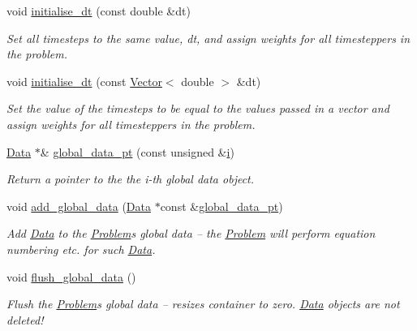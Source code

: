 \begin{DoxyCompactItemize}
void \hyperlink{classoomph_1_1Problem_a342b9bd9c4bc142f514907ee1d23d613}{initialise\+\_\+dt} (const double \&dt)
\begin{DoxyCompactList}\small\item\em Set all timesteps to the same value, dt, and assign weights for all timesteppers in the problem. \end{DoxyCompactList}\item 
void \hyperlink{classoomph_1_1Problem_a48137f1c7b297de56078f6bc0c83b675}{initialise\+\_\+dt} (const \hyperlink{classoomph_1_1Vector}{Vector}$<$ double $>$ \&dt)
\begin{DoxyCompactList}\small\item\em Set the value of the timesteps to be equal to the values passed in a vector and assign weights for all timesteppers in the problem. \end{DoxyCompactList}\item 
\hyperlink{classoomph_1_1Data}{Data} $\ast$\& \hyperlink{classoomph_1_1Problem_ae7e2bc78b6761fde803e9058658d1ded}{global\+\_\+data\+\_\+pt} (const unsigned \&\hyperlink{cfortran_8h_adb50e893b86b3e55e751a42eab3cba82}{i})
\begin{DoxyCompactList}\small\item\em Return a pointer to the the i-\/th global data object. \end{DoxyCompactList}\item 
void \hyperlink{classoomph_1_1Problem_a6f0c24728351d390d4f0a86d07bd8678}{add\+\_\+global\+\_\+data} (\hyperlink{classoomph_1_1Data}{Data} $\ast$const \&\hyperlink{classoomph_1_1Problem_ae7e2bc78b6761fde803e9058658d1ded}{global\+\_\+data\+\_\+pt})
\begin{DoxyCompactList}\small\item\em Add \hyperlink{classoomph_1_1Data}{Data} to the \hyperlink{classoomph_1_1Problem}{Problem}\textquotesingle{}s global data -- the \hyperlink{classoomph_1_1Problem}{Problem} will perform equation numbering etc. for such \hyperlink{classoomph_1_1Data}{Data}. \end{DoxyCompactList}\item 
void \hyperlink{classoomph_1_1Problem_aa8df5552c706bd949b29f5601f8c941e}{flush\+\_\+global\+\_\+data} ()
\begin{DoxyCompactList}\small\item\em Flush the \hyperlink{classoomph_1_1Problem}{Problem}\textquotesingle{}s global data -- resizes container to zero. \hyperlink{classoomph_1_1Data}{Data} objects are not deleted! \end{DoxyCompactList}\item 

\end{DoxyCompactItemize}
